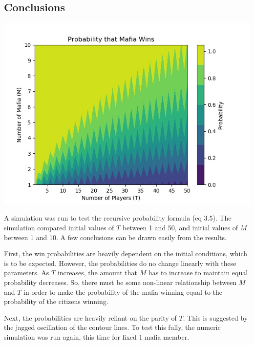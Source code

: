 \documentclass[12pt]{article}
\begin{document}
\subsection{Conclusions}
\begin{center}
	\includegraphics[width = \linewidth]{images/simple/simulation_results}
\end{center}

A simulation was run to test the recursive probability formula (eq 3.5). The simulation compared initial values of $T$ between 1 and 50, and initial values of $M$ between 1 and 10. A few conclusions can be drawn easily from the results.

First, the win probabilities are heavily dependent on the initial conditions, which is to be expected. However, the probabilities do no change linearly with these parameters. As $T$ increases, the amount that $M$ has to increase to maintain equal probability decreases. So, there must be some non-linear relationship between $M$ and $T$ in order to make the probability of the mafia winning equal to the probability of the citizens winning.

Next, the probabilities are heavily reliant on the parity of $T$. This is suggested by the jagged oscillation of the contour lines. To test this fully, the numeric simulation was run again, this time for fixed 1 mafia member.
\end{document}
